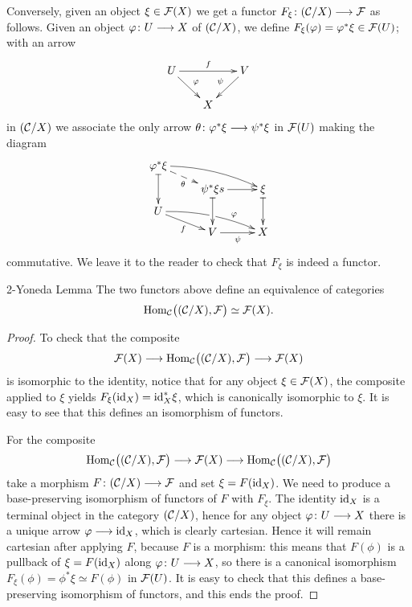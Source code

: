 \begin{3   FIBERED CATEGORIES}
\begin{3.6 Objects as fibcats and the 2-Yoneda}
Conversely, given an object $\xi \in \mathcal{F}(X)$ we get a functor $F_\xi \colon (\cC/X) \arr \cF$ as follows. Given an object $\phi\colon U \arr X$ of $(\mathcal{C}/X)$, we define $F_\xi (\varphi) = \varphi^* \xi \in \mathcal{F}(U)$; with an arrow
   \[
    \xymatrix@-6pt{
   U\ar[rd]^\phi\ar[rr]^f&&V\ar[ld]_\psi\\
   &X&
   }
   \]
in $(\mathcal{C}/X)$ we associate the only arrow $\theta \colon \phi^* \xi \arr \psi^* \xi$ in $\mathcal{F}(U)$ making the diagram 
   \[
   \xymatrix@R=6pt{{\phi^* \xi}{}\ar@{|->}[dd]
   \ar@{-->}[rd]_\theta
   \ar@/^/[rrd] \\
   & \psi^*\xi\ar@{|->}[dd]\ar[r]s
   &\xi\ar@{|->}[dd] \\
   U\ar[rd]_f\ar@/^/[rrd]|(.505)\hole^>>>>>\phi\\
   & V \ar[r]_\psi
   & X
   }
   \]
commutative. We leave it to the reader to check that $F_\xi$ is indeed a functor.

\begin{named}{2-Yoneda Lemma}\label{2-yoneda}
The two functors above define an equivalence of categories
   \[
   \operatorname{Hom}_{\mathcal{C}}\bigl((\mathcal{C}/X), \mathcal{F}\bigr)
   \simeq \mathcal{F}(X).
   \]
\end{named}

\begin{proof}
To check that the composite
   \[
   \cF(X) \arr 
   \hom_{\cC}\bigl((\cC/X), \cF\bigr)
   \arr \cF(X)
   \]
is isomorphic to the identity, notice that for any object $\xi \in \mathcal{F}(X)$, the composite applied to $\xi$ yields $F_\xi (\mathrm{id}_{X}) = \mathrm{id}_X^* \xi$, which is canonically isomorphic to $\xi$. It is easy to see that this defines an isomorphism of functors.

For the composite
   \[
   \hom_{\cC}\bigl((\cC/X), \cF\bigr)
   \arr \cF(X)
   \arr
   \hom_{\cC}\bigl((\cC/X), \cF\bigr)
   \]
take a morphism $F \colon (\cC/X) \arr \cF$ and set $\xi = F(\mathrm{id}_X)$. We need to produce a base-preserving isomorphism of functors of $F$ with $F_\xi$. The identity $\mathrm{id}_X$ is a terminal object in the category $(\mathcal{C}/X)$, hence for any object $\phi \colon U \arr X$ there is a unique arrow $\phi \arr \id_X$, which is clearly cartesian. Hence it will remain cartesian after applying $F$, because $F$ is a morphism: this means that $F(\phi)$ is a pullback of $\xi = F(\mathrm{id}_X)$ along $\phi \colon U \arr X$, so there is a canonical isomorphism $F_\xi(\phi) = \phi^*\xi \simeq F(\phi)$ in $\mathcal{F}(U)$. It is easy to check that this defines a base-preserving isomorphism of functors, and this ends the proof.
\end{proof}




\end{3.6 Objects as fibcats and the 2-Yoneda}
\end{3   FIBERED CATEGORIES}
